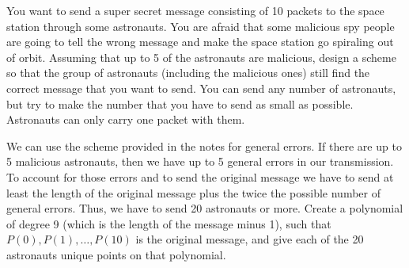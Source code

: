 \question You want to send a super secret message consisting of 10 
packets to the space station through some  astronauts. You are afraid 
that some malicious spy people are going to tell the wrong message and 
make the space station go spiraling out of orbit. Assuming that up to 
5 of the astronauts are malicious, design a scheme so that the group of 
astronauts (including the malicious ones) still find the correct message 
that you want to send. You can send any number of astronauts, but try to 
make the number that you have to send as small as possible. Astronauts 
can only carry one packet with them.
\begin{solution}[1.5 in]
We can use the scheme provided in the notes for general errors. If 
there are up to 5 malicious astronauts, then we have up to 5 general 
errors in our transmission. To account for those errors and to send 
the original message we have to send at least the length of the original 
message plus the twice the possible number of general errors. Thus, 
we have to send 20 astronauts or more. Create a polynomial of degree 
9 (which is the length of the message minus 1), such that $P(0), P(1), 
\dotsc, P(10)$ is the original message, and give each of the 20 
astronauts unique points on that polynomial. 
\end{solution}
